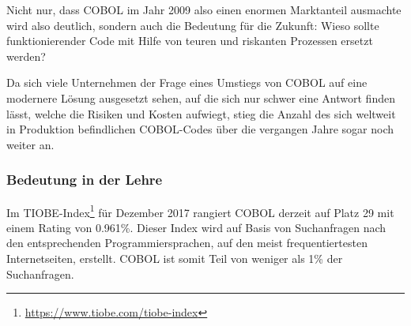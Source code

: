 Nicht nur, dass COBOL im Jahr 2009 also einen enormen Marktanteil ausmachte wird also deutlich, sondern auch die Bedeutung für die Zukunft: Wieso sollte funktionierender Code mit Hilfe von teuren und riskanten Prozessen ersetzt werden?

Da sich viele Unternehmen der Frage eines Umstiegs von COBOL auf eine modernere Lösung ausgesetzt sehen, auf die sich nur schwer eine Antwort finden lässt, welche die Risiken und Kosten aufwiegt, stieg die Anzahl  des sich weltweit in Produktion befindlichen COBOL-Codes über die vergangen Jahre sogar noch weiter an.

\subsubsection{Bedeutung in der Lehre}



Im TIOBE-Index\footnote{\url{https://www.tiobe.com/tiobe-index}} für Dezember 2017 rangiert COBOL derzeit auf Platz 29 mit einem Rating von 0.961\%. Dieser Index wird auf Basis von Suchanfragen nach den entsprechenden Programmiersprachen, auf den meist frequentiertesten Internetseiten, erstellt. COBOL ist somit Teil von weniger als 1\% der Suchanfragen.

